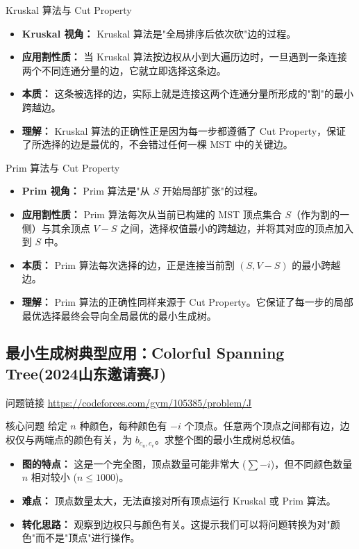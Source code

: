 \documentclass[11pt]{beamer}
\begin{document}
\begin{frame}{Kruskal 算法与 Cut Property}
    \begin{itemize}
        \item \textbf{Kruskal 视角：} Kruskal 算法是"全局排序后依次砍"边的过程。
        \item \textbf{应用割性质：} 当 Kruskal 算法按边权从小到大遍历边时，一旦遇到一条连接两个不同连通分量的边，它就立即选择这条边。
        \item \textbf{本质：} 这条被选择的边，实际上就是连接这两个连通分量所形成的"割"的最小跨越边。
        \item \textbf{理解：} Kruskal 算法的正确性正是因为每一步都遵循了 Cut Property，保证了所选择的边是最优的，不会错过任何一棵 MST 中的关键边。
    \end{itemize}
\end{frame}

\begin{frame}{Prim 算法与 Cut Property}
    \begin{itemize}
        \item \textbf{Prim 视角：} Prim 算法是"从 $S$ 开始局部扩张"的过程。
        \item \textbf{应用割性质：} Prim 算法每次从当前已构建的 MST 顶点集合 $S$（作为割的一侧）与其余顶点 $V-S$ 之间，选择权值最小的跨越边，并将其对应的顶点加入到 $S$ 中。
        \item \textbf{本质：} Prim 算法每次选择的边，正是连接当前割 $(S, V-S)$ 的最小跨越边。
        \item \textbf{理解：} Prim 算法的正确性同样来源于 Cut Property。它保证了每一步的局部最优选择最终会导向全局最优的最小生成树。
    \end{itemize}
\end{frame}

\subsection{最小生成树典型应用：Colorful Spanning Tree(2024山东邀请赛J)}
\begin{frame}
    \begin{block}{问题链接}
        \url{https://codeforces.com/gym/105385/problem/J}
    \end{block}
    \begin{block}{核心问题}
        给定 $n$ 种颜色，每种颜色有 $-i$ 个顶点。任意两个顶点之间都有边，边权仅与两端点的颜色有关，为 $b_{c_u, c_v}$。求整个图的最小生成树总权值。
    \end{block}
    \begin{itemize}
        \item \textbf{图的特点：} 这是一个完全图，顶点数量可能非常大 ($\sum -i$)，但不同颜色数量 $n$ 相对较小 ($n \le 1000$)。
        \item \textbf{难点：} 顶点数量太大，无法直接对所有顶点运行 Kruskal 或 Prim 算法。
        \item \textbf{转化思路：} 观察到边权只与颜色有关。这提示我们可以将问题转换为对"颜色"而不是"顶点"进行操作。
    \end{itemize}
\end{frame}
\end{document}
